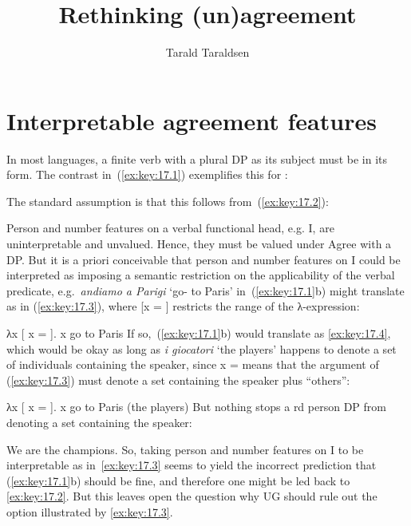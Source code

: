 \documentclass[output=paper]{langsci/langscibook}
\author{Tarald Taraldsen}
\title{Rethinking (un)agreement}
\begin{document}
\glsresetall
\maketitle

\section{Interpretable agreement features}\label{sec:key:17.1}

In most languages, a finite verb with a plural DP as its subject must be in its
\Tpl{} form. The contrast in~(\ref{ex:key:17.1}) exemplifies this for :

\ea\label{ex:key:17.1} 
    \ea[]{%
    \gll I giocatori vanno a Parigi.\\
        the players go-\Tpl{} to Paris\\
    \glt}
    \z
\z
The standard assumption is that this follows from~(\ref{ex:key:17.2}):

\ea\label{ex:key:17.2}
    \ea Person and number features on a verbal functional head, e.g. I, are
    uninterpretable and unvalued.
    \ex Hence, they must be valued under Agree with a DP.
    \z
\z
But it is a priori conceivable that person and number features on I could be
interpreted as imposing a semantic restriction on the applicability of the
verbal predicate, e.g.\ \emph{andiamo a Parigi} ‘go-\Fpl{} to Paris’
in~(\ref{ex:key:17.1}b) might translate as in (\ref{ex:key:17.3}), where [x = \Fpl{}]
restricts the range of the λ-expression:

\ea\label{ex:key:17.3}
    λx [ x = \Fpl{}]. x go to Paris
\z
If so,~(\ref{ex:key:17.1}b) would translate as \eqref{ex:key:17.4}, which would be okay as long as
\emph{i giocatori} ‘the players’ happens to denote a set of individuals
containing the speaker, since x = \Fpl{} means that the argument of
(\ref{ex:key:17.3}) must denote a set containing the speaker plus “others”:

\ea\label{ex:key:17.4}
    λx [ x = \Fpl{}]. x go to Paris (the players)
\z
But nothing stops a \Third{}rd person DP from denoting a set containing the
speaker:

\ea\label{ex:key:17.5}
    We are the champions.
\z
So, taking person and number features on I to be interpretable as
in~\eqref{ex:key:17.3} seems to yield the incorrect prediction that
(\ref{ex:key:17.1}b) should be fine, and therefore one might be led back to
\eqref{ex:key:17.2}. But this leaves open the question why UG should rule out
the option illustrated by \eqref{ex:key:17.3}.
\end{document}
